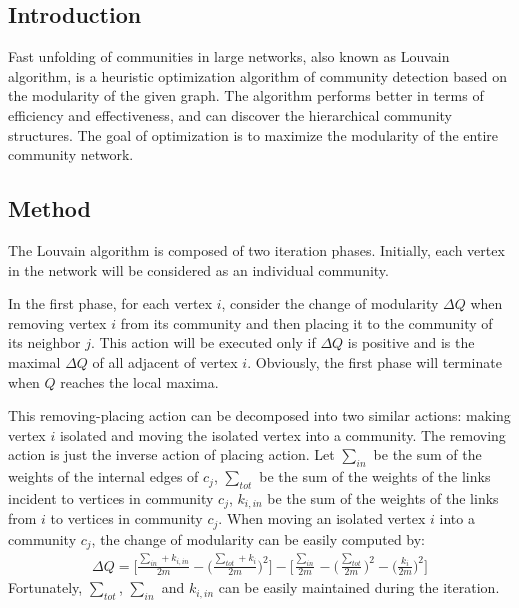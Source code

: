 \documentclass[11pt]{article}
\begin{document}
\subsection{Introduction}

Fast unfolding of communities in large networks, also known as Louvain algorithm\cite{louvain}, is a heuristic optimization algorithm of community detection based on the modularity of the given graph. The algorithm performs better in terms of efficiency and effectiveness, and can discover the hierarchical community structures. The goal of optimization is to maximize the modularity of the entire community network.

\subsection{Method}

The Louvain algorithm is composed of two iteration phases. Initially, each vertex in the network will be considered as an individual community.

\noindent In the first phase, for each vertex $i$, consider the change of modularity $\Delta{Q}$ when removing vertex $i$ from its community and then placing it to the community of its neighbor $j$. This action will be executed only if $\Delta{Q}$ is positive and is the maximal $\Delta{Q}$ of all adjacent of vertex $i$. Obviously, the first phase will terminate when $Q$ reaches the local maxima.

\noindent This removing-placing action can be decomposed into two similar actions: making vertex $i$ isolated and moving the isolated vertex into a community. The removing action is just the inverse action of placing action. Let $\sum_{in}$ be the sum of the weights of the internal edges of $c_{j}$, $\sum_{tot}$ be the sum of the weights of the links incident to vertices in community $c_{j}$, $k_{i, in}$ be the sum of the weights of the links from $i$ to vertices in community $c_{j}$. When moving an isolated vertex $i$ into a community $c_{j}$, the change of modularity can be easily computed by:
\begin{equation}
  \begin{split}
    \Delta{Q} = \bigg[\frac{\sum_{in} + k_{i, in}}{2m} - \bigg(\frac{\sum_{tot} + k_{i}}{2m}\bigg)^{2}\bigg] - \bigg[\frac{\sum_{in}}{2m} - \bigg(\frac{\sum_{tot}}{2m}\bigg)^{2} - \bigg(\frac{k_{i}}{2m}\bigg)^{2}\bigg]
  \end{split}
\end{equation}
Fortunately, $\sum_{tot}$, $\sum_{in}$ and $k_{i, in}$ can be easily maintained during the iteration.
\end{document}
